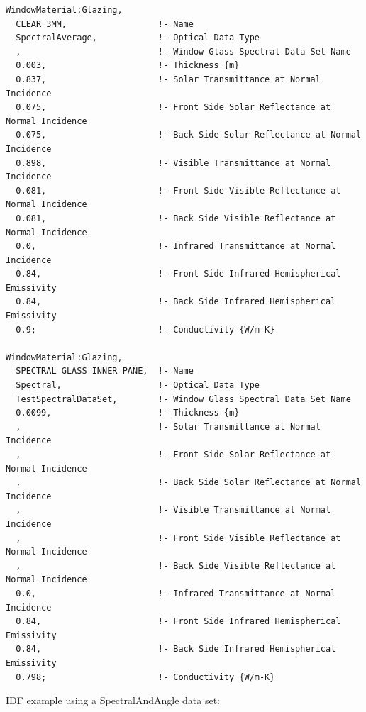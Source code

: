 \begin{lstlisting}
WindowMaterial:Glazing,
  CLEAR 3MM,                  !- Name
  SpectralAverage,            !- Optical Data Type
  ,                           !- Window Glass Spectral Data Set Name
  0.003,                      !- Thickness {m}
  0.837,                      !- Solar Transmittance at Normal Incidence
  0.075,                      !- Front Side Solar Reflectance at Normal Incidence
  0.075,                      !- Back Side Solar Reflectance at Normal Incidence
  0.898,                      !- Visible Transmittance at Normal Incidence
  0.081,                      !- Front Side Visible Reflectance at Normal Incidence
  0.081,                      !- Back Side Visible Reflectance at Normal Incidence
  0.0,                        !- Infrared Transmittance at Normal Incidence
  0.84,                       !- Front Side Infrared Hemispherical Emissivity
  0.84,                       !- Back Side Infrared Hemispherical Emissivity
  0.9;                        !- Conductivity {W/m-K}

WindowMaterial:Glazing,
  SPECTRAL GLASS INNER PANE,  !- Name
  Spectral,                   !- Optical Data Type
  TestSpectralDataSet,        !- Window Glass Spectral Data Set Name
  0.0099,                     !- Thickness {m}
  ,                           !- Solar Transmittance at Normal Incidence
  ,                           !- Front Side Solar Reflectance at Normal Incidence
  ,                           !- Back Side Solar Reflectance at Normal Incidence
  ,                           !- Visible Transmittance at Normal Incidence
  ,                           !- Front Side Visible Reflectance at Normal Incidence
  ,                           !- Back Side Visible Reflectance at Normal Incidence
  0.0,                        !- Infrared Transmittance at Normal Incidence
  0.84,                       !- Front Side Infrared Hemispherical Emissivity
  0.84,                       !- Back Side Infrared Hemispherical Emissivity
  0.798;                      !- Conductivity {W/m-K}
\end{lstlisting}

IDF example using a SpectralAndAngle data set:

